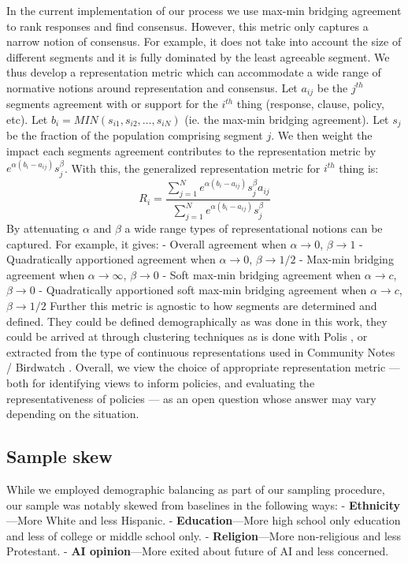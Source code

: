 \documentclass{article}
\begin{document}
 In the current implementation of our process we use max-min bridging agreement to rank responses and find consensus. However, this metric only captures a narrow notion of consensus. For example, it does not take into account the size of different segments and it is fully dominated by the least agreeable segment. We thus develop a representation metric which can accommodate a wide range of normative notions around representation and consensus. Let $a_{ij}$ be the $j^{th}$ segments agreement with or support for the $i^{th}$ thing (response, clause, policy, etc). Let $ b_i = MIN(s_{i1}, s_{i2}, … , s_{iN}) $ (ie. the max-min bridging agreement). Let $s_j$ be the fraction of the population comprising segment $j$. We then weight the impact each segments agreement contributes to the representation metric by $e^{\alpha(b_i-a_{ij})} s_j^{\beta}$. With this, the generalized representation metric for $i^{th}$ thing is:
\begin{equation}
R_i = \frac{\sum_{j=1}^N e^{\alpha(b_i-a_{ij})} s_j^{\beta}a_{ij} }{ \sum_{j=1}^N e^{\alpha(b_i-a_{ij})} s_j^{\beta}}
\end{equation}
By attenuating $\alpha$ and $\beta$ a wide range types of representational notions can be captured. For example, it gives:
-  Overall agreement when $\alpha\rightarrow0$, $\beta\rightarrow 1$
-  Quadratically apportioned agreement when $\alpha\rightarrow 0$, $\beta\rightarrow 1/2$
-  Max-min bridging agreement when $\alpha\rightarrow\infty$, $\beta\rightarrow 0$
-  Soft max-min bridging agreement when $\alpha\rightarrow c$, $\beta\rightarrow 0$
-  Quadratically apportioned soft max-min bridging agreement when $\alpha\rightarrow c$, $\beta\rightarrow 1/2$
Further this metric is agnostic to how segments are determined and defined. They could be defined demographically as was done in this work, they could be arrived at through clustering techniques as is done with Polis \cite{small2021polis}, or extracted from the type of continuous representations used in Community Notes / Birdwatch \cite{wojcik2022birdwatch}. Overall, we view the choice of appropriate representation metric --- both for identifying views to inform policies, and evaluating the representativeness of policies --- as an open question whose answer may vary depending on the situation. 


\subsection{Sample skew}
While we employed demographic balancing as part of our sampling procedure, our sample was notably skewed from baselines in the following ways:
-  \textbf{Ethnicity}---More White and less Hispanic.
-  \textbf{Education}---More high school only education and less of college or middle school only.
-  \textbf{Religion}---More non-religious and less Protestant.
-  \textbf{AI opinion}---More exited about future of AI and less concerned.
\end{document}
